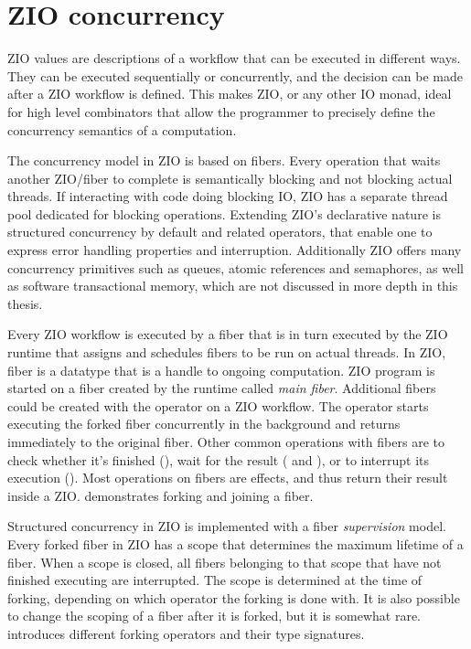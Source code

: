 \section{ZIO concurrency}
ZIO values are descriptions of a workflow that can be executed in different ways. They can be executed sequentially or concurrently, and the decision can be made after a ZIO workflow is defined. This makes ZIO, or any other IO monad, ideal for high level combinators that allow the programmer to precisely define the concurrency semantics of a computation.

The concurrency model in ZIO is based on fibers. Every operation that waits another ZIO/fiber to complete is semantically blocking and not blocking actual threads. If interacting with code doing blocking IO, ZIO has a separate thread pool dedicated for blocking operations. Extending ZIO's declarative nature is structured concurrency by default and related operators, that enable one to express error handling properties and interruption. Additionally ZIO offers many concurrency primitives such as queues, atomic references and semaphores, as well as software transactional memory, which are not discussed in more depth in this thesis.

Every ZIO workflow is executed by a fiber that is in turn executed by the ZIO runtime that assigns and schedules fibers to be run on actual threads. In ZIO, fiber is a datatype that is a handle to ongoing computation. ZIO program is started on a fiber created by the runtime called \textit{main fiber}. Additional fibers could be created with the  operator on a ZIO workflow. The  operator starts executing the forked fiber concurrently in the background and returns immediately to the original fiber. Other common operations with fibers are to check whether it's finished (), wait for the result ( and ), or to interrupt its execution (). Most operations on fibers are effects, and thus return their result inside a ZIO.  demonstrates forking and joining a fiber.



Structured concurrency in ZIO is implemented with a fiber \textit{supervision} model. Every forked fiber in ZIO has a scope that determines the maximum lifetime of a fiber. When a scope is closed, all fibers belonging to that scope that have not finished executing are interrupted. The scope is determined at the time of forking, depending on which operator the forking is done with. It is also possible to change the scoping of a fiber after it is forked, but it is somewhat rare.  introduces different forking operators and their type signatures.


